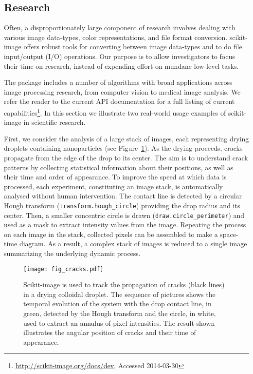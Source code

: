 
  \subsection*{Research}
    \label{sub:research}

    Often, a disproportionately large component of research involves dealing with various image data-types, color representations, and file format conversion. scikit-image offers robust tools for converting between image data-types \citep{DirectX,OpenGL,GraphicsGemsI} and to do file input/output (I/O) operations.  Our purpose is to allow investigators to focus their time on research, instead of expending effort on mundane low-level tasks.

    The package includes a number of algorithms with broad applications across image processing research, from computer vision to medical image analysis. We refer the reader to the current API documentation for a full listing of current capabilities\footnote{\url{http://scikit-image.org/docs/dev}, Accessed 2014-03-30}. In this section we illustrate two real-world usage examples of scikit-image in scientific research.

    First, we consider the analysis of a large stack of images, each representing drying droplets containing nanoparticles (see Figure~\ref{fig:cracks}). As the drying proceeds, cracks propagate from the edge of the drop to its center. The aim is to understand crack patterns by collecting statistical information about their positions, as well as their time and order of appearance. To improve the speed at which data is processed, each experiment, constituting an image stack, is automatically analysed without human intervention. The contact line is detected by a circular Hough transform (\texttt{transform.hough\_circle}) providing the drop radius and its center. Then, a smaller concentric circle is drawn (\texttt{draw.circle\_perimeter}) and used as a mask to extract intensity values from the image. Repeating the process on each image in the stack, collected pixels can be assembled to make a space-time diagram. As a result, a complex stack of images is reduced to a single image summarizing the underlying dynamic process.

    \begin{figure}[bht]
      \texttt{[image: fig\_cracks.pdf]}

      \caption{Scikit-image is used to track the propagation of cracks (black lines) in a drying colloidal droplet. The sequence of pictures shows the temporal evolution of the system with the drop contact line, in green, detected by the Hough transform and the circle, in white, used to extract an annulus of pixel intensities.  The result shown illustrates the angular position of cracks and their time of appearance. \label{fig:cracks}}
    \end{figure}

